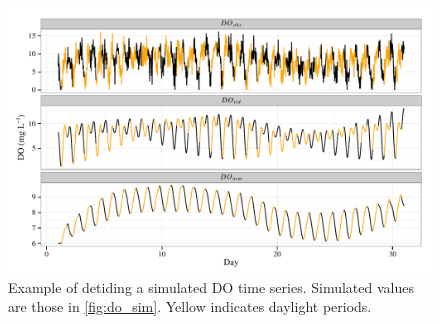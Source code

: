 \documentclass[letterpaper,12pt,oneside]{article}\usepackage[]{graphicx}\usepackage[]{color}
\makeatletter
\def\maxwidth{ %
  \ifdim\Gin@nat@width>\linewidth
    \linewidth
  \else
    \Gin@nat@width
  \fi
}
\newenvironment{knitrout}{}{} %
\makeatother
\begin{document}
\centering\vspace*{\fill}
\begin{knitrout}
\color{fgcolor}\begin{figure}[!ht]


{\centering \includegraphics[width=\maxwidth]{figure/do_dtd} 

}

\caption[Example of detiding a simulated \ac{DO} time series]{Example of detiding a simulated \ac{DO} time series.  Simulated values are those in \cref{fig:do_sim}.  Yellow indicates daylight periods.\label{fig:do_dtd}}
\end{figure}


\end{knitrout}
\vfill
\clearpage
\end{document}
